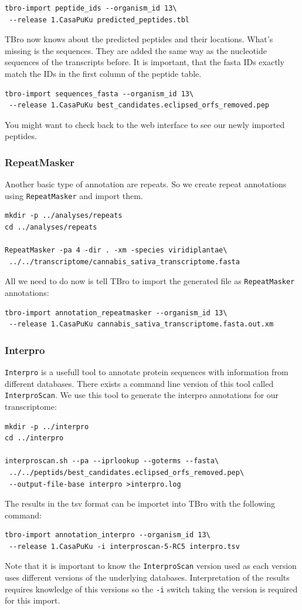 \documentclass[english]{scrartcl}
\begin{document}
\begin{lstlisting}
tbro-import peptide_ids --organism_id 13\
 --release 1.CasaPuKu predicted_peptides.tbl
\end{lstlisting}
TBro now knows about the predicted peptides and their locations. What's missing
is the sequences. They are added the same way as the nucleotide sequences of the
transcripts before. It is important, that the fasta IDs exactly match the IDs in
the first column of the peptide table.
\begin{lstlisting}
tbro-import sequences_fasta --organism_id 13\
 --release 1.CasaPuKu best_candidates.eclipsed_orfs_removed.pep
\end{lstlisting}
You might want to check back to the web interface to see our newly imported
peptides.

\subsubsection{RepeatMasker}
Another basic type of annotation are repeats. So we create repeat annotations
using \texttt{RepeatMasker} and import them.  
\begin{lstlisting}
mkdir -p ../analyses/repeats
cd ../analyses/repeats

RepeatMasker -pa 4 -dir . -xm -species viridiplantae\
 ../../transcriptome/cannabis_sativa_transcriptome.fasta
\end{lstlisting}
All we need to do now is tell TBro to import the generated file as \texttt{RepeatMasker}
annotations:
\begin{lstlisting}
tbro-import annotation_repeatmasker --organism_id 13\
 --release 1.CasaPuKu cannabis_sativa_transcriptome.fasta.out.xm
\end{lstlisting}

\subsubsection{Interpro}
\texttt{Interpro} is a usefull tool to annotate protein sequences with information from
different databases. There exists a command line version of this tool called
\texttt{InterproScan}. We use this tool to generate the interpro
annotations for our transcriptome:
\begin{lstlisting}
mkdir -p ../interpro
cd ../interpro

interproscan.sh --pa --iprlookup --goterms --fasta\
 ../../peptids/best_candidates.eclipsed_orfs_removed.pep\
 --output-file-base interpro >interpro.log
\end{lstlisting}
The results in the tsv format can be importet into TBro with the following
command:
\begin{lstlisting}
tbro-import annotation_interpro --organism_id 13\
 --release 1.CasaPuKu -i interproscan-5-RC5 interpro.tsv
\end{lstlisting}
Note that it is important to know the \texttt{InterproScan} version used as each
version uses different versions of the underlying databases. Interpretation of
the results requires knowledge of this versions so the \texttt{-i} switch taking
the version is required for this import.
\end{document}
